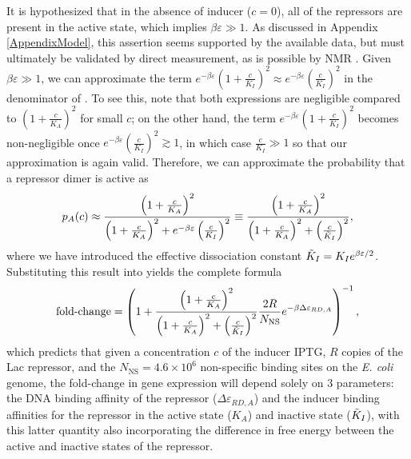 It is hypothesized that in the absence of inducer ($c=0$), all of the repressors
are present in the active state, which implies $\beta \varepsilon \gg 1$. As
discussed in Appendix \ref{AppendixModel}, this assertion seems supported by the
available data, but must ultimately be validated by direct measurement, as is
possible by NMR \cite{Gardino2003, Boulton2016}. Given $\beta \varepsilon \gg
1$, we can approximate the term $e^{-\beta \varepsilon}
\left(1+\frac{c}{K_I}\right)^2 \approx e^{-\beta  \varepsilon
}\left(\frac{c}{K_I}\right)^2$ in the denominator of \eref[AppendixEq5].  To see this,
note that both expressions are negligible compared to
$\left(1+\frac{c}{K_A}\right)^2$ for small $c$; on the other hand, the term
$e^{-\beta \varepsilon} \left(1+\frac{c}{K_I}\right)^2$ becomes non-negligible
once $e^{-\beta \varepsilon }\left(\frac{c}{K_I}\right)^2 \gtrsim 1$, in which
case $\frac{c}{K_I} \gg 1$ so that our approximation is again valid. Therefore,
we can approximate the probability that a repressor dimer is active as
\begin{equation}\label{AppendixEq6}
p_A(c) \approx \frac{\left(1+\frac{c}{K_A}\right)^2}{\left(1+\frac{c}{K_A}\right)^2+e^{-\beta  \varepsilon }\left(\frac{c}{K_I}\right)^2} \equiv \frac{\left(1+\frac{c}{K_A}\right)^2}{\left(1+\frac{c}{K_A}\right)^2+\left(\frac{c}{\tilde{K}_I}\right)^2},
\end{equation}
where we have introduced the effective dissociation constant $\tilde{K}_I = K_I
e^{\beta  \varepsilon/2}$. Substituting this result into \eref[eq5] yields the
complete formula
\begin{equation}\label{AppendixEq7}
\operatorname{fold-change}= \left(
1+\frac{\left(1+\frac{c}{K_A}\right)^2}{\left(1+\frac{c}{K_A}\right)^2+\left(\frac{c}{\tilde{K}_I}\right)^2}\frac{2 R}{N_{\text{NS}}}e^{-\beta \Delta\varepsilon_{RD,A}} \right)^{-1},
\end{equation}
which predicts that given a concentration \(c\) of the inducer IPTG, \(R\)
copies of the Lac repressor, and the $N_{\text{NS}} = 4.6 \times 10^6$ 
non-specific binding sites on the \textit{E. coli} genome, the fold-change in
gene expression will depend solely on 3 parameters: the DNA binding affinity of
the repressor ($\Delta\varepsilon_{RD,A}$) and the inducer binding affinities
for the repressor in the active state (\(K_A\)) and inactive state (\(\tilde{K}_I\)),
with this latter quantity also incorporating the difference in free energy
between the active and inactive states of the repressor.

